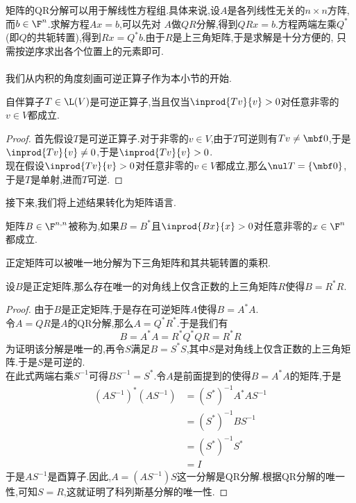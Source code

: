 \documentclass{ctexart}
\begin{document}
矩阵的QR分解可以用于解线性方程组.具体来说,设$A$是各列线性无关的$n\times n$方阵,而$b\in\F^n$.求解方程$Ax=b$,可以先对%
$A$做$QR$分解,得到$QRx=b$.方程两端左乘$Q^*$(即$Q$的共轭转置),得到$Rx=Q^*b$.由于$R$是上三角矩阵,于是求解是十分方便的,%
只需按逆序求出各个位置上的元素即可.\\
\\
我们从内积的角度刻画可逆正算子作为本小节的开始.
\begin{formal}[4.1 可逆正算子]
    自伴算子$T\in\L(V)$是可逆正算子,当且仅当$\inprod{Tv}{v}>0$对任意非零的$v\in V$都成立.
\end{formal}
\begin{proof}
    首先假设$T$是可逆正算子.对于非零的$v\in V$,由于$T$可逆则有$Tv\neq\mbf0$,于是$\inprod{Tv}{v}\neq0$,于是$\inprod{Tv}{v}>0$.\\
    现在假设$\inprod{Tv}{v}>0$对任意非零的$v\in V$都成立,那么$\nul T=\{\mbf0\}$,于是$T$是单射,进而$T$可逆.
\end{proof}\noindent
接下来,我们将上述结果转化为矩阵语言.
\begin{definition}[4.2 定义:正定矩阵]
    矩阵$B\in\F^{n,n}$被称为,如果$B=B^*$且$\inprod{Bx}{x}>0$对任意非零的$x\in\F^n$都成立.
\end{definition}\noindent
正定矩阵可以被唯一地分解为下三角矩阵和其共轭转置的乘积.
\begin{formal}[4.3 科列斯基分解]
    设$B$是正定矩阵,那么存在唯一的对角线上仅含正数的上三角矩阵$R$使得$B=R^*R$.
\end{formal}
\begin{proof}
    由于$B$是正定矩阵,于是存在可逆矩阵$A$使得$B=A^*A$.\\
    令$A=QR$是$A$的QR分解,那么$A=Q^*R^*$.于是我们有
    \[B=A^*A=R^*Q^*QR=R^*R\]
    为证明该分解是唯一的,再令$S$满足$B=S^*S$,其中$S$是对角线上仅含正数的上三角矩阵.于是$S$是可逆的.\\
    在此式两端右乘$S^{-1}$可得$BS^{-1}=S^*$.令$A$是前面提到的使得$B=A^*A$的矩阵,于是
    \[\begin{aligned}
        \left(AS^{-1}\right)^*\left(AS^{-1}\right)
        &= \left(S^*\right)^{-1}A^*AS^{-1} \\
        &= \left(S^*\right)^{-1}BS^{-1} \\
        &= \left(S^*\right)^{-1}S^* \\
        &= I
    \end{aligned}\]
    于是$AS^{-1}$是酉算子.因此,$A=\left(AS^{-1}\right)S$这一分解是QR分解.根据QR分解的唯一性,可知$S=R$,这就证明了科列斯基分解的唯一性.
\end{proof}
\end{document}
